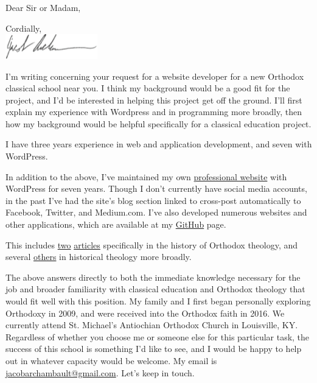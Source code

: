 \newcommand{\position}{taxonomy and ontology designer}
\newcommand{\companystreetaddress}{3100 Clarendon Blvd}
\newcommand{\city}{Arlington}
\newcommand{\stateshort}{VA}
\newcommand{\zipcode}{22201}
\newcommand{\jobrequirement}{both concrete ontology experience and abstract logical ability}
\clearpage
\recipient{}{}
\date{\today}
\opening{Dear Sir or Madam,}
\closing{Cordially, \\ \includegraphics[width=4cm]{cover-letter/signature} \vspace{-1cm}}
\makelettertitle

I'm writing concerning your request for a website developer for a new Orthodox classical school near you. I think my background would be a good fit for the project, and I'd be interested in helping this project get off the ground. I'll first explain my experience with Wordpress and in programming more broadly, then how my background would be helpful specifically for a classical education project.

I have three years experience in web and application development, and seven with WordPress.
 
In addition to the above, I've maintained my own \href{https://jacobarchambault.com}{professional website} with WordPress for seven years. Though I don't currently have social media accounts, in the past I've had the site's blog section linked to cross-post automatically to Facebook, Twitter, and Medium.com. I've also developed numerous websites and other applications, which are available at my \href{https://github.com/JacobArchambault}{GitHub} page.

 
This includes \href{https://www.academia.edu/41385588/Counterpossibles_and_Normal_Defaults_in_the_Filioque_Controversy}{two} \href{https://www.academia.edu/19927006/Nature_will_and_the_Fall_in_Augustine_and_Maximus_the_Confessor}{articles} specifically in the history of Orthodox theology, and several \href{https://fordham.academia.edu/JacobArchambault}{others} in historical theology more broadly.

 

The above answers directly to both the immediate knowledge necessary for the job and broader familiarity with classical education and Orthodox theology that would fit well with this position. My family and I first began personally exploring Orthodoxy in 2009, and were received into the Orthodox faith in 2016. We currently attend St. Michael's Antiochian Orthodox Church in Louisville, KY. Regardless of whether you choose me or someone else for this particular task, the success of this school is something I'd like to see, and I would be happy to help out in whatever capacity would be welcome. My email is \href{mailto:jacobarchambault@gmail.com}{jacobarchambault@gmail.com}. Let's keep in touch.

\makeletterclosing